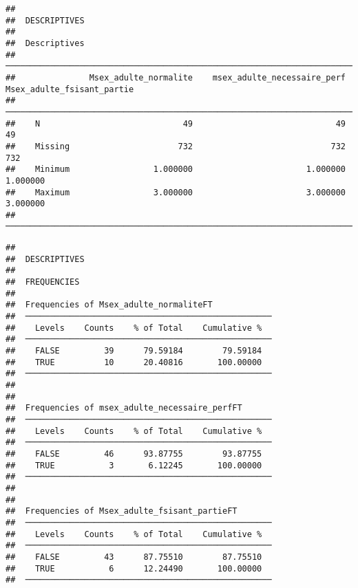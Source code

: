 \documentclass[
]{article}
\begin{document}
\begin{verbatim}
## 
##  DESCRIPTIVES
## 
##  Descriptives                                                                                      
##  ───────────────────────────────────────────────────────────────────────────────────────────────── 
##               Msex_adulte_normalite    msex_adulte_necessaire_perf    Msex_adulte_fsisant_partie   
##  ───────────────────────────────────────────────────────────────────────────────────────────────── 
##    N                             49                             49                            49   
##    Missing                      732                            732                           732   
##    Minimum                 1.000000                       1.000000                      1.000000   
##    Maximum                 3.000000                       3.000000                      3.000000   
##  ─────────────────────────────────────────────────────────────────────────────────────────────────
\end{verbatim}

\begin{verbatim}
## 
##  DESCRIPTIVES
## 
##  FREQUENCIES
## 
##  Frequencies of Msex_adulte_normaliteFT             
##  ────────────────────────────────────────────────── 
##    Levels    Counts    % of Total    Cumulative %   
##  ────────────────────────────────────────────────── 
##    FALSE         39      79.59184        79.59184   
##    TRUE          10      20.40816       100.00000   
##  ────────────────────────────────────────────────── 
## 
## 
##  Frequencies of msex_adulte_necessaire_perfFT       
##  ────────────────────────────────────────────────── 
##    Levels    Counts    % of Total    Cumulative %   
##  ────────────────────────────────────────────────── 
##    FALSE         46      93.87755        93.87755   
##    TRUE           3       6.12245       100.00000   
##  ────────────────────────────────────────────────── 
## 
## 
##  Frequencies of Msex_adulte_fsisant_partieFT        
##  ────────────────────────────────────────────────── 
##    Levels    Counts    % of Total    Cumulative %   
##  ────────────────────────────────────────────────── 
##    FALSE         43      87.75510        87.75510   
##    TRUE           6      12.24490       100.00000   
##  ──────────────────────────────────────────────────
\end{verbatim}
\end{document}
